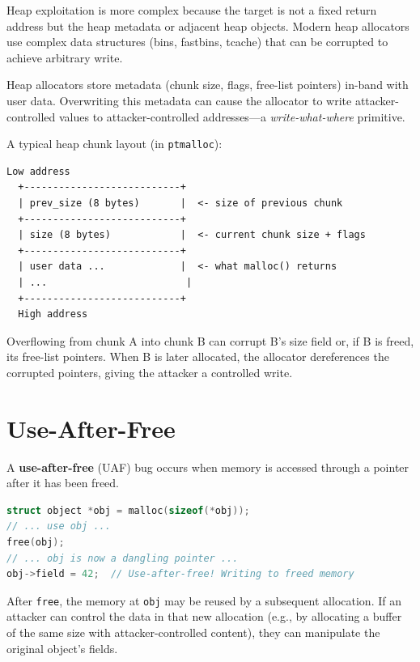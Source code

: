 Heap exploitation is more complex because the target is not a fixed return address but the heap metadata or adjacent heap objects. Modern heap allocators use complex data structures (bins, fastbins, tcache) that can be corrupted to achieve arbitrary write.

\begin{definition}
	Heap allocators store metadata (chunk size, flags, free-list pointers) in-band with user data. Overwriting this metadata can cause the allocator to write attacker-controlled values to attacker-controlled addresses---a \emph{write-what-where} primitive.
\end{definition}

A typical heap chunk layout (in \texttt{ptmalloc}):

\begin{lstlisting}[caption=Heap chunk structure (simplified)]
  Low address
  +---------------------------+
  | prev_size (8 bytes)       |  <- size of previous chunk
  +---------------------------+
  | size (8 bytes)            |  <- current chunk size + flags
  +---------------------------+
  | user data ...             |  <- what malloc() returns
  | ...                        |
  +---------------------------+
  High address
\end{lstlisting}

Overflowing from chunk A into chunk B can corrupt B's size field or, if B is freed, its free-list pointers. When B is later allocated, the allocator dereferences the corrupted pointers, giving the attacker a controlled write.

\section{Use-After-Free}

A \textbf{use-after-free} (UAF) bug occurs when memory is accessed through a pointer after it has been freed.

\begin{lstlisting}[language=C, caption=Use-after-free example]
struct object *obj = malloc(sizeof(*obj));
// ... use obj ...
free(obj);
// ... obj is now a dangling pointer ...
obj->field = 42;  // Use-after-free! Writing to freed memory
\end{lstlisting}

After \texttt{free}, the memory at \texttt{obj} may be reused by a subsequent allocation. If an attacker can control the data in that new allocation (e.g., by allocating a buffer of the same size with attacker-controlled content), they can manipulate the original object's fields.

